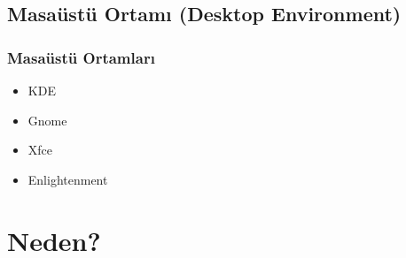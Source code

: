 \documentclass{beamer}
\begin{document}
	\subsection{Masaüstü Ortamı (Desktop Environment)}
		\begin{frame}
		 	\frametitle{Masaüstü Ortamları}
				\begin{itemize}
				 \item KDE
				 \item Gnome
				 \item Xfce
				 \item Enlightenment
				\end{itemize}

		\end{frame}


\section{Neden?}
\end{document}
